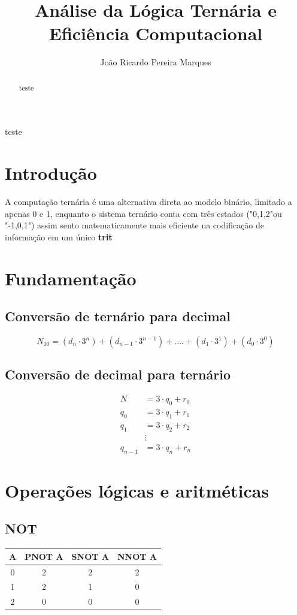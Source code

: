 \documentclass[12pt]{article}
\title{Análise da Lógica Ternária e Eficiência Computacional}
\author{João Ricardo Pereira Marques\inst{1} }
\begin{document}
 
\maketitle
\begin{abstract}
	teste
\end{abstract}
\begin{resumo}
	teste
\end{resumo}

\section{Introdução}
A computação ternária é uma alternativa direta ao modelo binário, limitado a apenas 0 e 1, enquanto o sistema ternário conta com três estados ("0,1,2"ou "-1,0,1") assim sento matematicamente mais eficiente na codificação de informação em um único \textbf{trit}
\section{Fundamentação}
\subsection{Conversão de ternário para decimal}

\begin{equation}
	N_{10} = (d_n \cdot 3^n)+(d_{n-1} \cdot 3^{n-1})+....+(d_1 \cdot 3^1)+(d_0 \cdot 3^0)
\end{equation}

\subsection{Conversão de decimal para ternário}
\begin{equation}
	\begin{split}
		N   &= 3 \cdot q_0 + r_0 \\
		q_0 &= 3 \cdot q_1 + r_1 \\
		q_1 &= 3 \cdot q_2 + r_2 \\
		&\vdots \\
		q_{n-1} &= 3 \cdot q_n + r_n
	\end{split}
\end{equation}
\section{Operações lógicas e aritméticas}
\subsection{NOT}
\centering
\begin{tabular}{|c|c|c|c|}
	\hline
	\textbf{A} & PNOT \textbf{A}& SNOT \textbf{A}& NNOT \textbf{A}\\\hline
	0&2&2&2\\\hline
	1&2&1&0\\\hline
	2&0&0&0\\\hline
\end{tabular}
\end{document}
